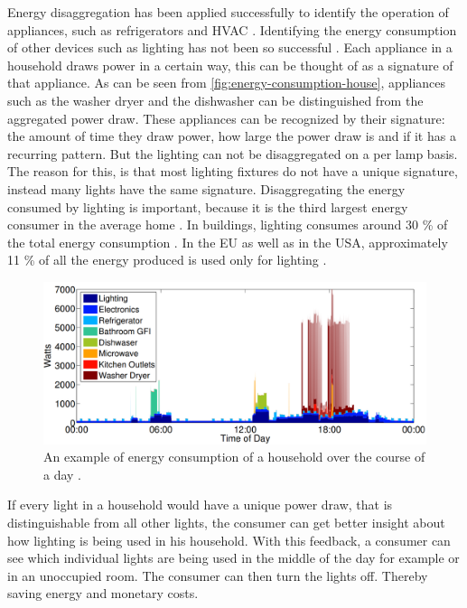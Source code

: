 Energy disaggregation has been applied successfully to identify the operation of appliances, such as refrigerators and HVAC \cite{kolter2011redd} \cite{spiegel2014energy}.
Identifying the energy consumption of other devices such as lighting has not been so successful \cite{spiegel2014energy} \cite{batra2015neighbourhood}.
Each appliance in a household draws power in a certain way, this can be thought of as a signature of that appliance.
As can be seen from \autoref{fig:energy-consumption-house}, appliances such as the washer dryer and the dishwasher can be distinguished from the aggregated power draw.
These appliances can be recognized by their signature: the amount of time they draw power, how large the power draw is and if it has a recurring pattern. %
But the lighting can not be disaggregated on a per lamp basis.
The reason for this, is that most lighting fixtures do not have a unique signature, instead many lights have the same signature.
Disaggregating the energy consumed by lighting is important, because it is the third largest energy consumer in the average home \cite{batra2015neighbourhood}.
In buildings, lighting consumes around 30 \% of the total energy consumption \cite{halonen2010guidebook}.
In the EU as well as in the USA, approximately 11 \% of all the energy produced is used only for lighting \cite{bertoldi2009electricity} \cite{outlook2010energy}.

\begin{figure}[t]
	\centering
	\includegraphics[width=\textwidth]{chapters/introduction-chapters/energy-consumption-house.png}
	\caption{An example of energy consumption of a household over the course of a day \cite{kolter2011redd}.}
	\label{fig:energy-consumption-house}
\end{figure}




If every light in a household would have a unique power draw, that is distinguishable from all other lights, the consumer can get better insight about how lighting is being used in his household. 
With this feedback, a consumer can see which individual lights are being used in the middle of the day for example or in an unoccupied room.
The consumer can then turn the lights off.
Thereby saving energy and monetary costs.



